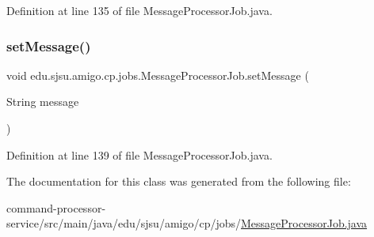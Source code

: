 Definition at line 135 of file Message\+Processor\+Job.\+java.

\mbox{\label{classedu_1_1sjsu_1_1amigo_1_1cp_1_1jobs_1_1_message_processor_job_a42d759558f2fa32f7e42eb3693004dba}} 
\subsubsection{\texorpdfstring{set\+Message()}{setMessage()}}
{\footnotesize\ttfamily void edu.\+sjsu.\+amigo.\+cp.\+jobs.\+Message\+Processor\+Job.\+set\+Message (\begin{DoxyParamCaption}\item[{String}]{message }\end{DoxyParamCaption})}



Definition at line 139 of file Message\+Processor\+Job.\+java.



The documentation for this class was generated from the following file\+:\begin{DoxyCompactItemize}
\item 
command-\/processor-\/service/src/main/java/edu/sjsu/amigo/cp/jobs/\hyperlink{_message_processor_job_8java}{Message\+Processor\+Job.\+java}\end{DoxyCompactItemize}
